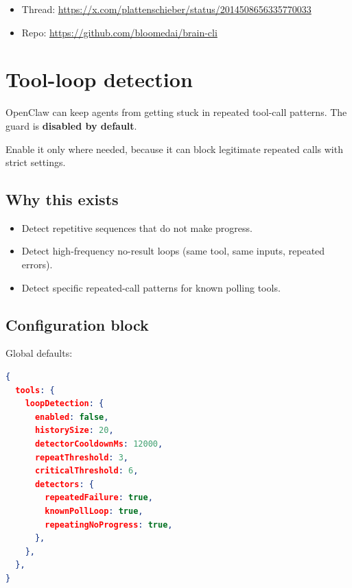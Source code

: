 \begin{itemize}
  \item Thread: \href{https://x.com/plattenschieber/status/2014508656335770033}{https://x.com/plattenschieber/status/2014508656335770033}
  \item Repo: \href{https://github.com/bloomedai/brain-cli}{https://github.com/bloomedai/brain-cli}
\end{itemize}



\clearpage

\section{Tool-loop detection}


OpenClaw can keep agents from getting stuck in repeated tool-call patterns.
The guard is \textbf{disabled by default}.

Enable it only where needed, because it can block legitimate repeated calls with strict settings.

\subsection{Why this exists}


\begin{itemize}
  \item Detect repetitive sequences that do not make progress.
  \item Detect high-frequency no-result loops (same tool, same inputs, repeated errors).
  \item Detect specific repeated-call patterns for known polling tools.
\end{itemize}


\subsection{Configuration block}


Global defaults:

\begin{lstlisting}[language=json]
{
  tools: {
    loopDetection: {
      enabled: false,
      historySize: 20,
      detectorCooldownMs: 12000,
      repeatThreshold: 3,
      criticalThreshold: 6,
      detectors: {
        repeatedFailure: true,
        knownPollLoop: true,
        repeatingNoProgress: true,
      },
    },
  },
}
\end{lstlisting}


